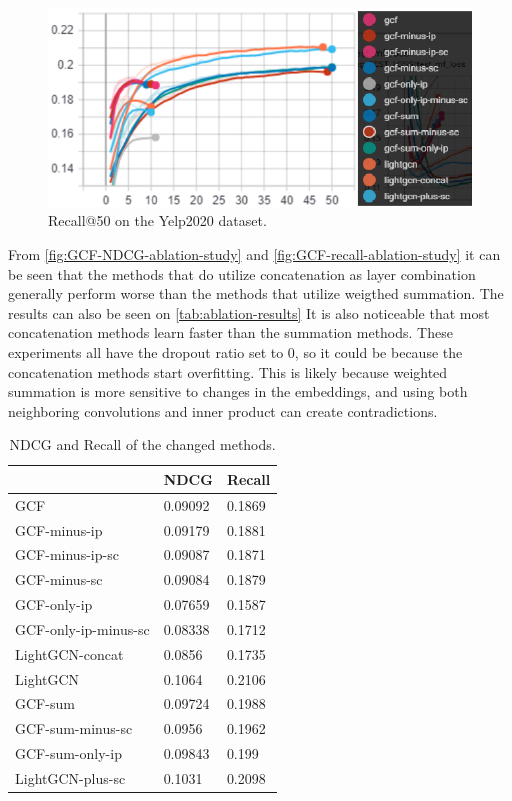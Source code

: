 \begin{figure}[h!]
    \includegraphics[width=\linewidth]{figures/gcf-all-recall.png}
    \caption{Recall@50 on the Yelp2020 dataset.}
    \label{fig:GCF-recall-ablation-study}
\end{figure}
From \autoref{fig:GCF-NDCG-ablation-study} and \autoref{fig:GCF-recall-ablation-study} it can be seen that the methods that do utilize concatenation as layer combination generally perform worse than the methods that utilize weigthed summation.
The results can also be seen on \autoref{tab:ablation-results}
It is also noticeable that most concatenation methods learn faster than the summation methods.
These experiments all have the dropout ratio set to 0, so it could be because the concatenation methods start overfitting.
This is likely because weighted summation is more sensitive to changes in the embeddings, and using both neighboring convolutions and inner product can create contradictions.
\begin{table}[]
    \centering
    \begin{tabular}{|l|l|l|}
        \hline
                             & NDCG    & Recall \\ \hline
        GCF                  & 0.09092 & 0.1869 \\ \hline
        GCF-minus-ip         & 0.09179 & 0.1881 \\ \hline
        GCF-minus-ip-sc      & 0.09087 & 0.1871 \\ \hline
        GCF-minus-sc         & 0.09084 & 0.1879 \\ \hline
        GCF-only-ip          & 0.07659 & 0.1587 \\ \hline
        GCF-only-ip-minus-sc & 0.08338 & 0.1712 \\ \hline
        LightGCN-concat      & 0.0856  & 0.1735 \\ \hline
        LightGCN             & 0.1064  & 0.2106 \\ \hline
        GCF-sum              & 0.09724 & 0.1988 \\ \hline
        GCF-sum-minus-sc     & 0.0956  & 0.1962 \\ \hline
        GCF-sum-only-ip      & 0.09843 & 0.199  \\ \hline
        LightGCN-plus-sc     & 0.1031  & 0.2098 \\ \hline
    \end{tabular}
    \caption{NDCG and Recall of the changed methods.}
    \label{tab:ablation-results}
\end{table}
